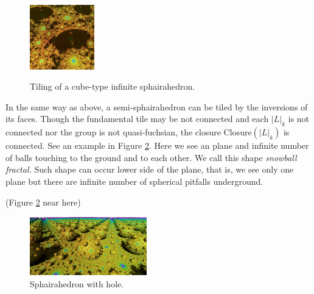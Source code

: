 \documentclass[suppldata, dvipdfmx]{interact}
\theoremstyle{plain}%
\theoremstyle{definition}
\theoremstyle{remark}
\theoremstyle{problemstyle}
\begin{document}
\begin{figure}[h!tbp]
\begin{minipage}[t]{0.18\textwidth}
  \label{fig:terrainStep10}
 \end{minipage}
 \hspace*{\fill}
 \begin{minipage}[t]{0.18\textwidth}
  \centering
  \includegraphics[height=1.1in, keepaspectratio]{./img/constructFractal/terrainProcess/final.jpg}
  \label{fig:sphairaPrismFinal}
 \end{minipage}
 \caption{Tiling of a cube-type infinite sphairahedron.}
 \label{fig:sphairahedralPrismTile}
\end{figure}

In the same way as above, a semi-sphairahedron
can be tiled by the inversions of its faces.
Though the fundamental tile may be not connected and each $|L|_k$ is not connected nor the group is not quasi-fuchsian, the closure $\text{Closure}(|L|_k)$ is connected.  
See an example in Figure \ref{fig:semiSphairaSpheres}.  Here we see an plane and infinite number of balls touching to the ground and to each other.  We call this shape {\it snowball fractal.}  Such shape can occur lower side of the plane, that is, we see only one plane but there are infinite number of spherical pitfalls underground.

(Figure \ref{fig:semiSphairaSpheres} near here)
\begin{figure}[h!tbp]
  \centering
 \includegraphics[width=2in,
 keepaspectratio]{./img/constructFractal/semi-terrain2.jpg}
 \caption{Sphairahedron with hole.}
  \label{fig:semiSphairaSpheres}
\end{figure}
\end{document}
